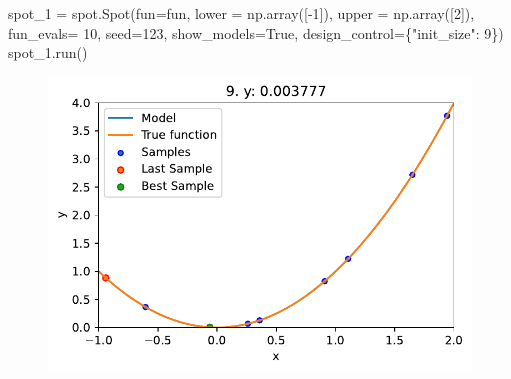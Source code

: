 \documentclass[
  letterpaper,
  DIV=11,
  numbers=noendperiod]{scrreprt}
\newenvironment{Shaded}{\begin{snugshade}}{\end{snugshade}}
\newcommand{\DecValTok}[1]{\textcolor[rgb]{0.68,0.00,0.00}{#1}}
\newcommand{\NormalTok}[1]{\textcolor[rgb]{0.00,0.23,0.31}{#1}}
\newcommand{\OperatorTok}[1]{\textcolor[rgb]{0.37,0.37,0.37}{#1}}
\newcommand{\StringTok}[1]{\textcolor[rgb]{0.13,0.47,0.30}{#1}}
\newcommand{\VariableTok}[1]{\textcolor[rgb]{0.07,0.07,0.07}{#1}}
\begin{document}
\begin{Shaded}
\begin{Highlighting}[]
\NormalTok{spot\_1 }\OperatorTok{=}\NormalTok{ spot.Spot(fun}\OperatorTok{=}\NormalTok{fun,}
\NormalTok{                   lower }\OperatorTok{=}\NormalTok{ np.array([}\OperatorTok{{-}}\DecValTok{1}\NormalTok{]),}
\NormalTok{                   upper }\OperatorTok{=}\NormalTok{ np.array([}\DecValTok{2}\NormalTok{]),}
\NormalTok{                   fun\_evals}\OperatorTok{=} \DecValTok{10}\NormalTok{,}
\NormalTok{                   seed}\OperatorTok{=}\DecValTok{123}\NormalTok{,}
\NormalTok{                   show\_models}\OperatorTok{=}\VariableTok{True}\NormalTok{,}
\NormalTok{                   design\_control}\OperatorTok{=}\NormalTok{\{}\StringTok{"init\_size"}\NormalTok{: }\DecValTok{9}\NormalTok{\})}
\NormalTok{spot\_1.run()}
\end{Highlighting}
\end{Shaded}

\begin{figure}[H]

{\centering \includegraphics{007_num_spot_intro_files/figure-pdf/cell-10-output-1.pdf}

}

\end{figure}
\end{document}
